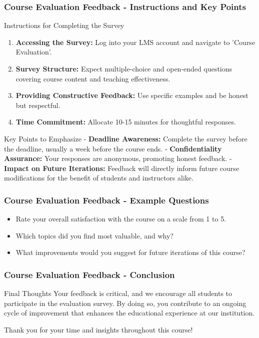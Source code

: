 \documentclass[aspectratio=169]{beamer}
\begin{document}
\begin{frame}[fragile]
  \frametitle{Course Evaluation Feedback - Instructions and Key Points}
  
  \begin{block}{Instructions for Completing the Survey}
    \begin{enumerate}
      \item \textbf{Accessing the Survey:} Log into your LMS account and navigate to 'Course Evaluation'.
      \item \textbf{Survey Structure:} Expect multiple-choice and open-ended questions covering course content and teaching effectiveness.
      \item \textbf{Providing Constructive Feedback:} Use specific examples and be honest but respectful.
      \item \textbf{Time Commitment:} Allocate 10-15 minutes for thoughtful responses.
    \end{enumerate}
  \end{block}

  \begin{block}{Key Points to Emphasize}
    - \textbf{Deadline Awareness:} Complete the survey before the deadline, usually a week before the course ends.
    - \textbf{Confidentiality Assurance:} Your responses are anonymous, promoting honest feedback.
    - \textbf{Impact on Future Iterations:} Feedback will directly inform future course modifications for the benefit of students and instructors alike.
  \end{block}

\end{frame}

\begin{frame}[fragile]
  \frametitle{Course Evaluation Feedback - Example Questions}
  
  \begin{itemize}
    \item Rate your overall satisfaction with the course on a scale from 1 to 5.
    \item Which topics did you find most valuable, and why?
    \item What improvements would you suggest for future iterations of this course?
  \end{itemize}

\end{frame}

\begin{frame}[fragile]
  \frametitle{Course Evaluation Feedback - Conclusion}
  
  \begin{block}{Final Thoughts}
    Your feedback is critical, and we encourage all students to participate in the evaluation survey. 
    By doing so, you contribute to an ongoing cycle of improvement that enhances the educational experience at our institution.
  \end{block}
  
  Thank you for your time and insights throughout this course!

\end{frame}
\end{document}
